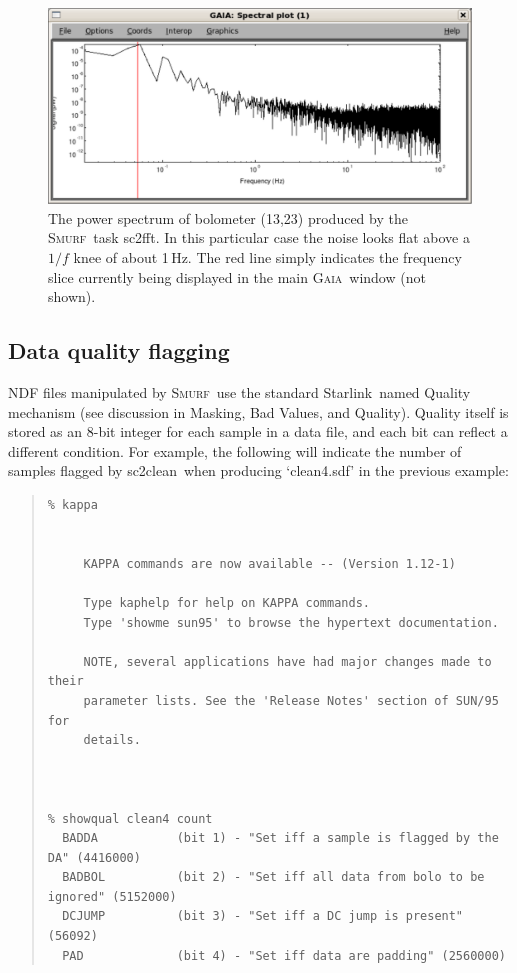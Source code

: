 \documentclass[twoside,11pt]{article}
\newcommand{\htmladdnormallink}[2]{#1}
\newcommand{\xref}[3]{#1}
\newcommand{\xlabel}[1]{}
\renewcommand{\_}{\texttt{\symbol{95}}}
\newenvironment{myquote}{\begin{quote}\begin{small}}{\end{small}\end{quote}}
\newcommand{\starlink}{\htmladdnormallink{Starlink}{http://starlink.jach.hawaii.edu}}
\newcommand{\gaia}{\xref{\textsc{Gaia}}{sun214}{}}
\newcommand{\smurf}{\xref{\textsc{Smurf}}{sun258}{}}
\newcommand{\task}[1]{\textsf{#1}}
\newcommand{\fft}{\xref{\task{sc2fft}}{sun258}{SC2FFT}}
\newcommand{\clean}{\xref{\task{sc2clean}}{sun258}{SC2CLEAN}}
\begin{document}
\begin{figure}
\begin{center}
\includegraphics[width=\linewidth]{sc19_pspec}
\caption{The power spectrum of bolometer (13,23) produced by the
  \smurf\ task \fft. In this particular case the noise looks flat
  above a $1/f$ knee of about 1\,Hz. The red line simply indicates the
  frequency slice currently being displayed in the main \gaia\ window
  (not shown).}
\label{fig:pspec}
\end{center}
\end{figure}

\subsection{\xlabel{quality}Data quality flagging}
\label{sec:quality}

NDF files manipulated by \smurf\ use the standard \starlink\ named
Quality mechanism (see discussion in \xref{Masking, Bad Values, and
  Quality}{sun95}{se_masking}). Quality itself is stored as an 8-bit
integer for each sample in a data file, and each bit can reflect a
different condition. For example, the following will indicate the
number of samples flagged by \clean\ when producing `clean4.sdf' in
the previous example:

\begin{myquote}
\begin{verbatim}
% kappa


     KAPPA commands are now available -- (Version 1.12-1)

     Type kaphelp for help on KAPPA commands.
     Type 'showme sun95' to browse the hypertext documentation.

     NOTE, several applications have had major changes made to their
     parameter lists. See the 'Release Notes' section of SUN/95 for
     details.



% showqual clean4 count
  BADDA           (bit 1) - "Set iff a sample is flagged by the DA" (4416000)
  BADBOL          (bit 2) - "Set iff all data from bolo to be ignored" (5152000)
  DCJUMP          (bit 3) - "Set iff a DC jump is present" (56092)
  PAD             (bit 4) - "Set iff data are padding" (2560000)

\end{verbatim}
\end{myquote}
\end{document}
